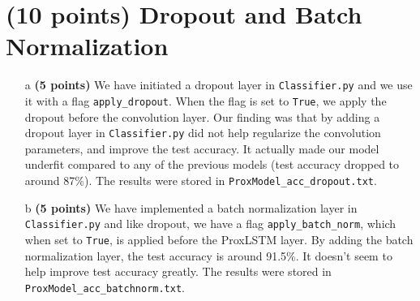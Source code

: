 \documentclass[11pt]{report}
\begin{document}
\section{(10 points) Dropout and Batch Normalization}
\begin{itemize}
    \item[a] \textbf{(5 points)} We have initiated a dropout layer in \texttt{Classifier.py} and we use it with a flag \texttt{apply\_dropout}. When the flag is set to \texttt{True}, we apply the dropout before the convolution layer. 
    Our finding was that by adding a dropout layer in \texttt{Classifier.py} did not help regularize the convolution parameters, and improve the test accuracy. 
    It actually made our model underfit compared to any of the previous models (test accuracy dropped to around 87\%).  
    The results were stored in \texttt{ProxModel\_acc\_dropout.txt}.

    \item[b] \textbf{(5 points)} We have implemented a batch normalization layer in \texttt{Classifier.py} and like dropout, we have a flag \texttt{apply\_batch\_norm}, which when set to \texttt{True}, is applied before the ProxLSTM layer. 
    By adding the batch normalization layer, the test accuracy is around 91.5\%. 
    It doesn't seem to help improve test accuracy greatly. 
    The results were stored in \texttt{ProxModel\_acc\_batchnorm.txt}.
\end{itemize}
\end{document}
